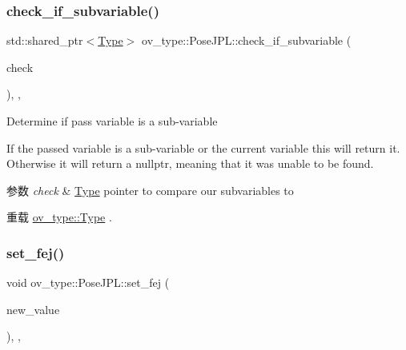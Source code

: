 \subsubsection{\texorpdfstring{check\+\_\+if\+\_\+subvariable()}{check\_if\_subvariable()}}
{\footnotesize\ttfamily std\+::shared\+\_\+ptr$<$\hyperlink{classov__type_1_1Type}{Type}$>$ ov\+\_\+type\+::\+Pose\+J\+P\+L\+::check\+\_\+if\+\_\+subvariable (\begin{DoxyParamCaption}\item[{const std\+::shared\+\_\+ptr$<$ \hyperlink{classov__type_1_1Type}{Type} $>$}]{check }\end{DoxyParamCaption})\hspace{0.3cm}{\ttfamily [inline]}, {\ttfamily [override]}, {\ttfamily [virtual]}}



Determine if pass variable is a sub-\/variable 

If the passed variable is a sub-\/variable or the current variable this will return it. Otherwise it will return a nullptr, meaning that it was unable to be found.


\begin{DoxyParams}{参数}
{\em check} & \hyperlink{classov__type_1_1Type}{Type} pointer to compare our subvariables to \\
\hline
\end{DoxyParams}


重载 \hyperlink{classov__type_1_1Type_a95fcdbc584256baffc78935de5ab5da3}{ov\+\_\+type\+::\+Type} .

\mbox{\label{classov__type_1_1PoseJPL_aa20a30cf44fefdb749565c0e60fe027a}} 
\subsubsection{\texorpdfstring{set\+\_\+fej()}{set\_fej()}}
{\footnotesize\ttfamily void ov\+\_\+type\+::\+Pose\+J\+P\+L\+::set\+\_\+fej (\begin{DoxyParamCaption}\item[{const Eigen\+::\+Matrix\+Xd \&}]{new\+\_\+value }\end{DoxyParamCaption})\hspace{0.3cm}{\ttfamily [inline]}, {\ttfamily [override]}, {\ttfamily [virtual]}}



